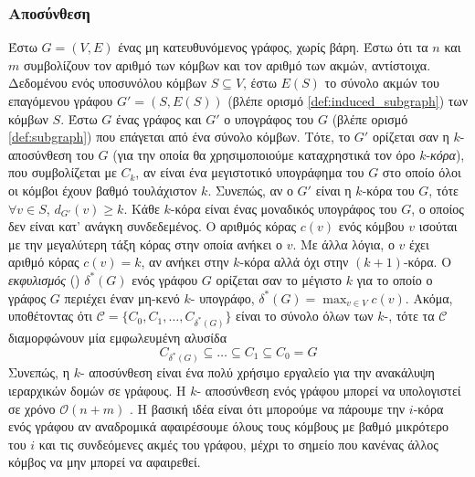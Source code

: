 \subsubsection{ Αποσύνθεση}
Έστω $G = (V,E)$ ένας μη κατευθυνόμενος γράφος, χωρίς βάρη.
Έστω ότι τα $n$ και $m$ συμβολίζουν τον αριθμό των κόμβων και τον αριθμό των ακμών, αντίστοιχα.
Δεδομένου ενός υποσυνόλου κόμβων $S \subseteq V$, έστω $E(S)$ το σύνολο ακμών του επαγόμενου γράφου $G'=(S,E(S))$  (βλέπε  ορισμό \ref{def:induced_subgraph}) των κόμβων $S$.
Έστω $G$ ένας γράφος και $G'$ ο υπογράφος του $G$ (βλέπε ορισμό \ref{def:subgraph}) που επάγεται από ένα σύνολο κόμβων.
Τότε, το $G'$ ορίζεται σαν η $k$- αποσύνθεση του $G$ (για την οποία θα χρησιμοποιούμε καταχρηστικά τον όρο $k$-\textit{κόρα}), που συμβολίζεται με $C_k$, αν είναι ένα μεγιστοτικό υπογράφημα του $G$ στο οποίο όλοι οι κόμβοι έχουν βαθμό τουλάχιστον $k$.
Συνεπώς, αν ο $G'$ είναι η $k$-κόρα του $G$, τότε $\forall v \in S$, $d_{G'}(v) \geq k$.
Κάθε $k$-κόρα είναι ένας μοναδικός υπογράφος του $G$, ο οποίος δεν είναι κατ' ανάγκη συνδεδεμένος.
Ο αριθμός κόρας $c(v)$ ενός κόμβου $v$ ισούται με την μεγαλύτερη τάξη κόρας στην οποία ανήκει ο $v$.
Με άλλα λόγια, ο $v$ έχει αριθμό κόρας $c(v) = k$, αν ανήκει στην $k$-κόρα αλλά όχι στην $(k+1)$-κόρα.
Ο \textit{εκφυλισμός} () $\delta^*(G)$ ενός γράφου $G$ ορίζεται σαν το μέγιστο $k$ για το οποίο ο γράφος $G$ περιέχει έναν μη-κενό $k$- υπογράφο, $\delta^*(G) = \max_{v \in V}c(v)$.
Ακόμα, υποθέτοντας ότι $\mathcal{C} = \{  C_0, C_1, \ldots, C_{\delta^*(G)} \}$ είναι το σύνολο όλων των $k$-, τότε τα $\mathcal{C}$ διαμορφώνουν μία εμφωλευμένη αλυσίδα
\begin{equation}
    C_{\delta^*(G)} \subseteq \ldots \subseteq C_1 \subseteq C_0 = G
\end{equation}
Συνεπώς, η $k$- αποσύνθεση είναι ένα πολύ χρήσιμο εργαλείο για την ανακάλυψη ιεραρχικών δομών σε γράφους.
Η $k$- αποσύνθεση ενός γράφου μπορεί να υπολογιστεί σε χρόνο $\mathcal{O}(n+m)$ \cite{matula1983smallest,batagelj2011fast}.
Η βασική ιδέα είναι ότι μπορούμε να πάρουμε την $i$-κόρα ενός γράφου αν αναδρομικά αφαιρέσουμε όλους τους κόμβους με βαθμό μικρότερο του $i$ και τις συνδεόμενες ακμές του γράφου, μέχρι το σημείο που κανένας άλλος κόμβος να μην μπορεί να αφαιρεθεί.
